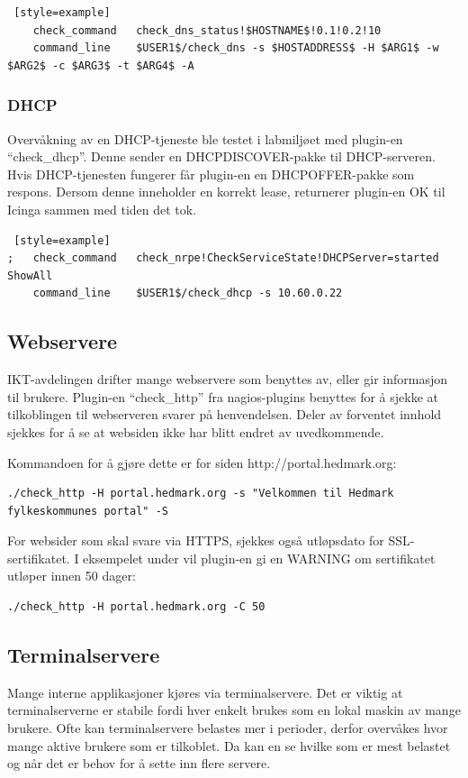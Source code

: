 \begin{lstlisting} [style=example]
    check_command	check_dns_status!$HOSTNAME$!0.1!0.2!10
    command_line	$USER1$/check_dns -s $HOSTADDRESS$ -H $ARG1$ -w $ARG2$ -c $ARG3$ -t $ARG4$ -A
\end{lstlisting}

\subsubsection*{DHCP}
Overvåkning av en DHCP-tjeneste ble testet i labmiljøet med plugin-en ``check\_dhcp''. Denne sender en DHCPDISCOVER-pakke til DHCP-serveren. Hvis DHCP-tjenesten fungerer får plugin-en en DHCPOFFER-pakke som respons. Dersom denne inneholder en korrekt lease, returnerer plugin-en OK til Icinga sammen med tiden det tok.

\begin{lstlisting} [style=example]
;   check_command	check_nrpe!CheckServiceState!DHCPServer=started ShowAll
    command_line	$USER1$/check_dhcp -s 10.60.0.22
\end{lstlisting}

\subsection{Webservere}\label{sec:webservere}
IKT-avdelingen drifter mange webservere som benyttes av, eller gir informasjon til brukere. Plugin-en ``check\_http'' \cite{checkhttp} fra nagios-plugins benyttes for å sjekke at tilkoblingen til webserveren svarer på henvendelsen. Deler av forventet innhold sjekkes for å se at websiden ikke har blitt endret av uvedkommende.

Kommandoen for å gjøre dette er for siden http://portal.hedmark.org:
\begin{lstlisting}[style=example]
./check_http -H portal.hedmark.org -s "Velkommen til Hedmark fylkeskommunes portal" -S 
\end{lstlisting}

For websider som skal svare via HTTPS, sjekkes også utløpsdato for SSL-sertifikatet. I eksempelet under vil plugin-en gi en WARNING om sertifikatet utløper innen 50 dager:
\begin{lstlisting}[style=example]
./check_http -H portal.hedmark.org -C 50
\end{lstlisting}

\subsection{Terminalservere}\label{sec:terminalservere}
Mange interne applikasjoner kjøres via terminalservere. Det er viktig at terminalserverne er stabile fordi hver enkelt brukes som en lokal maskin av mange brukere. Ofte kan terminalservere belastes mer i perioder, derfor overvåkes hvor mange aktive brukere som er tilkoblet. Da kan en se hvilke som er mest belastet og når det er behov for å sette inn flere servere.

